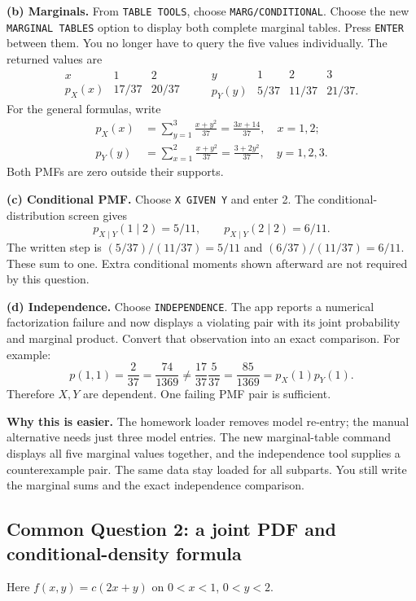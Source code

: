 \textbf{(b) Marginals.} From \texttt{TABLE TOOLS}, choose \texttt{MARG/CONDITIONAL}. Choose the new \texttt{MARGINAL TABLES} option to display both complete marginal tables. Press \texttt{ENTER} between them. You no longer have to query the five values individually. The returned values are
\[
\begin{array}{c|cc}
x&1&2\\\hline
p_X(x)&17/37&20/37
\end{array}
\qquad
\begin{array}{c|ccc}
y&1&2&3\\\hline
p_Y(y)&5/37&11/37&21/37.
\end{array}
\]
For the general formulas, write
\[
\begin{aligned}
p_X(x)&=\sum_{y=1}^3\frac{x+y^2}{37}=\frac{3x+14}{37},\quad x=1,2;\\
p_Y(y)&=\sum_{x=1}^2\frac{x+y^2}{37}=\frac{3+2y^2}{37},\quad y=1,2,3.
\end{aligned}
\]
Both PMFs are zero outside their supports.

\textbf{(c) Conditional PMF.} Choose \texttt{X GIVEN Y} and enter 2. The conditional-distribution screen gives
\[
\boxed{p_{X\mid Y}(1\mid2)=5/11,\qquad p_{X\mid Y}(2\mid2)=6/11.}
\]
The written step is $(5/37)/(11/37)=5/11$ and $(6/37)/(11/37)=6/11$. These sum to one. Extra conditional moments shown afterward are not required by this question.

\textbf{(d) Independence.} Choose \texttt{INDEPENDENCE}. The app reports a numerical factorization failure and now displays a violating pair with its joint probability and marginal product. Convert that observation into an exact comparison. For example:
\[
p(1,1)=\frac2{37}=\frac{74}{1369}
\ne \frac{17}{37}\frac5{37}=\frac{85}{1369}=p_X(1)p_Y(1).
\]
Therefore $X,Y$ are dependent. One failing PMF pair is sufficient.

\textbf{Why this is easier.} The homework loader removes model re-entry; the manual alternative needs just three model entries. The new marginal-table command displays all five marginal values together, and the independence tool supplies a counterexample pair. The same data stay loaded for all subparts. You still write the marginal sums and the exact independence comparison.

\clearpage
\subsection{Common Question 2: a joint PDF and conditional-density formula}
Here $f(x,y)=c(2x+y)$ on $0<x<1$, $0<y<2$.

